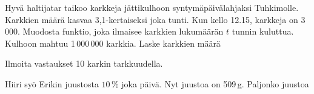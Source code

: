 	
	\begin{tehtava}
	Hyvä haltijatar taikoo karkkeja jättikulhoon syntymäpäivälahjaksi Tuhkimolle. Karkkien määrä kasvaa 3,1-kertaiseksi joka tunti. Kun kello 12.15, karkkeja on 3\,000. Muodosta funktio, joka ilmaisee karkkien lukumäärän $t$ tunnin kuluttua. Kulhoon mahtuu 1\,000\,000 karkkia. Laske karkkien määrä
	
	Ilmoita vastaukset 10 karkin tarkkuudella.
	

\begin{vastaus}
\end{vastaus}
\end{tehtava}

\begin{tehtava}
	Hiiri syö Erikin juustosta $10\,\%$ joka päivä. Nyt juustoa on 509\,g. Paljonko juustoa 
	
	

\begin{vastaus}
\end{vastaus}
\end{tehtava}




